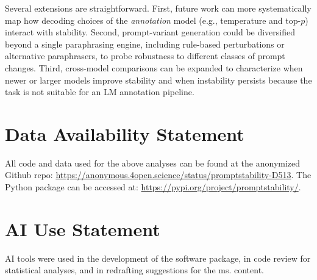 \documentclass{article}
\begin{document}
Several extensions are straightforward. First, future work can more systematically map how decoding choices of the \emph{annotation} model (e.g., temperature and top-$p$) interact with stability. Second, prompt-variant generation could be diversified beyond a single paraphrasing engine, including rule-based perturbations or alternative paraphrasers, to probe robustness to different classes of prompt changes. Third, cross-model comparisons can be expanded to characterize when newer or larger models improve stability and when instability persists because the task is not suitable for an LM annotation pipeline. 

\section{Data Availability Statement}

All code and data used for the above analyses can be found at the anonymized Github repo: \url{https://anonymous.4open.science/status/promptstability-D513}. The Python package can be accessed at: \url{https://pypi.org/project/promptstability/}.

\section{AI Use Statement}

AI tools were used in the development of the software package, in code review for statistical analyses, and in redrafting suggestions for the ms. content.

\clearpage

\clearpage

\end{document}
